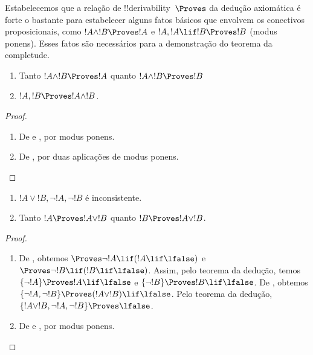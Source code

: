\documentclass[../../../include/open-logic-section]{subfiles}
\begin{document}
      {}
      {}


\begin{explain}
  Estabelecemos que a relação de !!{derivability}~$\Proves$ da dedução
  axiomática é forte o bastante para estabelecer alguns fatos básicos
  que envolvem os conectivos proposicionais, como $!A \land !B \Proves
  !A$ e $!A, !A \lif !B \Proves !B$ (modus ponens). Esses fatos são
  necessários para a demonstração do teorema da completude.
\end{explain}

\begin{prop}
  \begin{enumerate}
  \item {} Tanto $!A \land !B \Proves
    !A$ quanto $!A \land !B \Proves !B$
  \item {} $!A, !B \Proves !A \land !B$.
  \end{enumerate}
\end{prop}

\begin{proof}
  \begin{enumerate}
    \item De  e , por
      modus ponens.
  \item De , por duas aplicações de
    modus ponens.
  \end{enumerate}
\end{proof}


\begin{prop}
  \begin{enumerate}
  \item $!A \lor !B, \lnot !A, \lnot !B$ é inconsistente.
  \item Tanto $!A \Proves !A \lor !B$ quanto $!B \Proves !A \lor !B$.
  \end{enumerate}
\end{prop}

\begin{proof}
  \begin{enumerate}
  \item De , obtemos $\Proves \lnot !A \lif (!A
    \lif \lfalse)$ e $\Proves \lnot !B \lif (!B \lif \lfalse)$. Assim,
    pelo teorema da dedução, temos $\{\lnot !A\} \Proves !A \lif
    \lfalse$ e $\{\lnot !B\} \Proves !B \lif \lfalse$. De
    , obtemos $\{\lnot !A, \lnot !B\} \Proves (!A
    \lor !B) \lif \lfalse$. Pelo teorema da dedução, $\{!A \lor !B,
    \lnot !A, \lnot !B\} \Proves \lfalse$.
  \item De  e , por modus
    ponens.
  \end{enumerate}
\end{proof}
\end{document}
